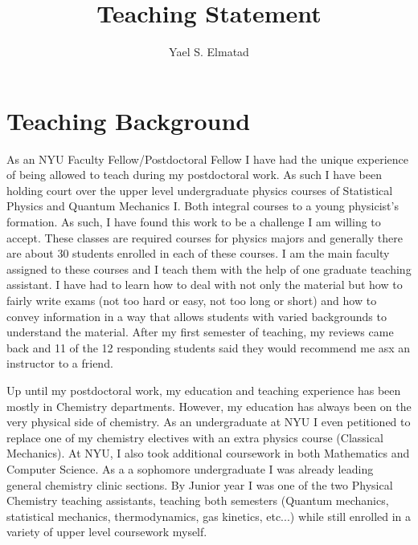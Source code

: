\documentclass[11pt]{article}
\title{{Teaching Statement}}
\author{Yael S. Elmatad}
\date{}                                           %
\begin{document}
\maketitle
%

\section{Teaching Background}

As an NYU Faculty Fellow/Postdoctoral Fellow I have had the unique experience of being allowed to teach during my postdoctoral work.  As such I have been holding court over the upper level undergraduate physics courses of Statistical Physics and Quantum Mechanics I.  Both integral courses to a young physicist's formation.  As such, I have found this work to be a challenge I am willing to accept. These classes are required courses for physics majors and generally there are about 30 students enrolled in each of these courses.  I am the main faculty assigned to these courses and I teach them with the help of one graduate teaching assistant.    I have had to learn how to deal with not only the material but how to fairly write exams (not too hard or easy, not too long or short) and how to convey information in a way that allows students with varied backgrounds to understand the material.  After my first semester of teaching, my reviews came back and 11 of the 12 responding students said they would recommend me asx an instructor to a friend.

Up until my postdoctoral work, my education and teaching experience has been mostly in Chemistry departments.  However, my education has always been on the very physical side of chemistry.  As an undergraduate at NYU I even petitioned to replace one of my chemistry electives with an extra physics course (Classical Mechanics).  At NYU, I also took additional coursework in both Mathematics and Computer Science.  As a a sophomore undergraduate I was already leading general chemistry clinic sections.  By Junior year I was one of the two Physical Chemistry teaching assistants, teaching both semesters (Quantum mechanics, statistical mechanics, thermodynamics, gas kinetics, etc...) while still enrolled in a variety of upper level coursework myself.
\end{document}
